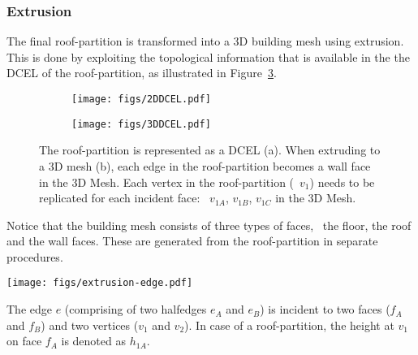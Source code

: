 \subsubsection{Extrusion}
\label{sec:extrusion}
The final roof-partition is transformed into a 3D building mesh using extrusion.
This is done by exploiting the topological information that is available in the the DCEL of the roof-partition, as illustrated in Figure~\ref{fig:extrusion}.
\begin{figure}
	\centering
	\begin{subfigure}[b]{0.45\linewidth}
		\texttt{[image: figs/2DDCEL.pdf]}
		\caption{}%
		\label{subfig:2ddcel}
	\end{subfigure}
	\quad
	\begin{subfigure}[b]{0.45\linewidth}
		\texttt{[image: figs/3DDCEL.pdf]}
		\caption{}%
		\label{subfig:3ddcel}
	\end{subfigure}
	\caption{The roof-partition is represented as a DCEL (a). When extruding to a 3D mesh (b), each edge in the roof-partition becomes a wall face in the 3D Mesh. Each vertex in the roof-partition (\eg\ $v_1$) needs to be replicated for each incident face: \eg\ $v_{1A}$, $v_{1B}$, $v_{1C}$ in the 3D Mesh.}%
	\label{fig:extrusion}
\end{figure}
Notice that the building mesh consists of three types of faces, \ie\ the floor, the roof and the wall faces.
These are generated from the roof-partition in separate procedures.

\begin{marginfigure}
	\centering
	\texttt{[image: figs/extrusion-edge.pdf]}
	\caption{The edge $e$ (comprising of two halfedges $e_A$ and $e_B$) is incident to two faces ($f_A$ and $f_B$) and two vertices ($v_1$ and $v_2$). In case of a roof-partition, the height at $v_1$ on face $f_A$ is denoted as $h_{1A}$.}%
	\label{fig:extrusion-notation}
\end{marginfigure}

